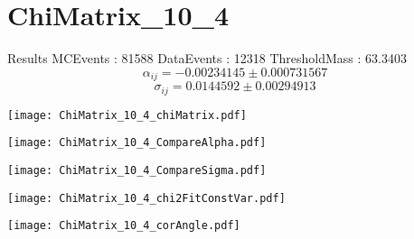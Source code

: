 \documentclass[a4paper,12pt]{article}
\begin{document}
\section{ChiMatrix\_10\_4}
\begin{minipage}{0.49\linewidth} Results \newline
MCEvents : 81588\newline
DataEvents : 12318 \newline
ThresholdMass : 63.3403\\
$$\alpha_{ij} = -0.00234145\pm 0.000731567$$
$$\sigma_{ij} = 0.0144592\pm 0.00294913$$
\end{minipage}\hfill
\begin{minipage}{0.49\linewidth} 
\texttt{[image: ChiMatrix\_10\_4\_chiMatrix.pdf]}\\
\end{minipage}
\hfill
\begin{minipage}{0.49\linewidth} 
\texttt{[image: ChiMatrix\_10\_4\_CompareAlpha.pdf]}\\
\end{minipage}
\hfill
\begin{minipage}{0.49\linewidth} 
\texttt{[image: ChiMatrix\_10\_4\_CompareSigma.pdf]}\\
\end{minipage}
\begin{minipage}{0.49\linewidth} 
\texttt{[image: ChiMatrix\_10\_4\_chi2FitConstVar.pdf]}\\
\end{minipage}
\hfill
\begin{minipage}{0.49\linewidth} 
\texttt{[image: ChiMatrix\_10\_4\_corAngle.pdf]}\\
\end{minipage}
\end{document}
